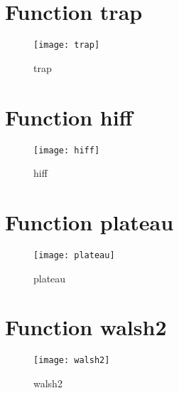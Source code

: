 \section{Function trap}
\begin{center}

\end{center}
\begin{center}

\end{center}
\begin{figure}[h]
\centering
\begin{center}
\texttt{[image: trap]}
\caption{trap}
\end{center}
\end{figure}
\newpage
\section{Function hiff}
\begin{center}

\end{center}
\begin{center}

\end{center}
\begin{figure}[h]
\centering
\begin{center}
\texttt{[image: hiff]}
\caption{hiff}
\end{center}
\end{figure}
\newpage
\section{Function plateau}
\begin{center}

\end{center}
\begin{center}

\end{center}
\begin{figure}[h]
\centering
\begin{center}
\texttt{[image: plateau]}
\caption{plateau}
\end{center}
\end{figure}
\newpage
\section{Function walsh2}
\begin{center}

\end{center}
\begin{center}

\end{center}
\begin{figure}[h]
\centering
\begin{center}
\texttt{[image: walsh2]}
\caption{walsh2}
\end{center}
\end{figure}
